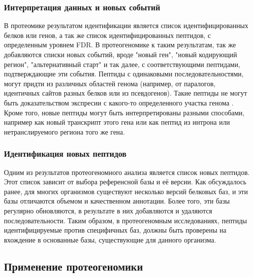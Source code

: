 \subsubsection{Интерпретация данных и новых событий}
В протеомике результатом идентификации является список идентифицированных белков или генов, а так же список идентифицированных пептидов, с определенным уровнем FDR. В протеогеномике к таким результатам, так же добавляются списки новых событий, вроде "новый ген", "новый кодирующий регион", "альтернативный старт" и так далее, с соответствующими пептидами, подтверждающие эти события. Пептиды с одинаковыми последовательностями, могут придти из различных областей генома (например, от паралогов, идентичных сайтов разных белков или из псевдогенов). Такие пептиды не могут быть доказательством экспресии с какого-то определенного участка генома \cite{nesvizhskii2005interpretation}. Кроме того, новые пептиды могут быть интерпретированы разными способами, например как новый транскрипт этого гена или как пептид из интрона или нетранслируемого региона того же гена. 

\subsubsection{Идентификация новых пептидов}
Одним из результатов протеогеномного анализа является список новых пептидов. Этот список зависит от выбора референсной базы и её версии. Как обсуждалось ранее, для многих организмов существуют несколько версий белковых баз, и эти базы отличаются объемом и качественном аннотации. Более того, эти базы регулярно обновляются, в результате в них добавляются и удаляются последовательности. Таким образом, в протеогеномным исследованиях, пептиды идентифицируемые против специфичных баз, должны быть проверены на вхождение в основанные базы, существующие для данного организма.

\subsection{Применение протеогеномики}

